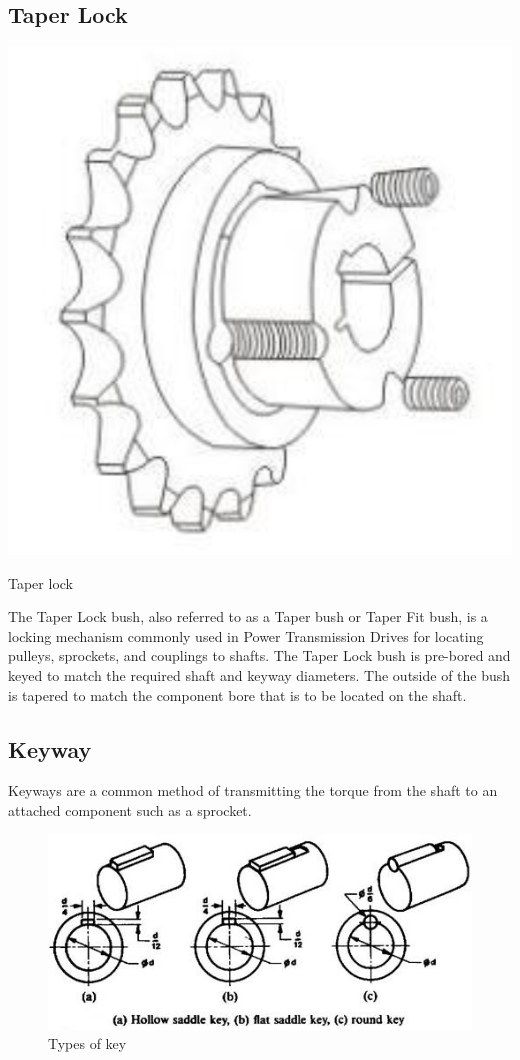 \subsection{Taper Lock} 

\begin{marginfigure}
    \centering
    \includegraphics[width=\textwidth]{09_fixtures_and_fittings/taper-lock.png}
    \caption{Taper lock}
\end{marginfigure}
The Taper Lock bush, also referred to as a Taper bush or Taper Fit bush, is a locking mechanism commonly used in Power Transmission Drives for locating pulleys, sprockets, and couplings to shafts. 
The Taper Lock bush is pre-bored and keyed to match the required shaft and keyway diameters. 
The outside of the bush is tapered to match the component bore that is to be located on the shaft.

\subsection{Keyway} 

Keyways are a common method of transmitting the torque from the shaft to an attached component such as a sprocket.

\begin{figure}[h!]
    \centering
    \includegraphics[width=\textwidth]{09_fixtures_and_fittings/keys.jpg}
    \caption{Types of key}
\end{figure}

